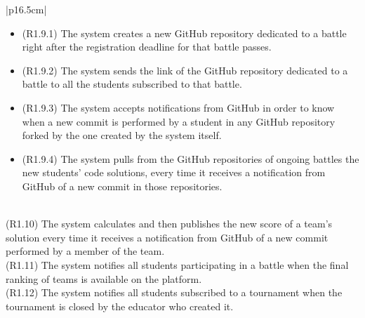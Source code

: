 \begin{longtable}{|p{16.5cm}|}
\begin{minipage}[t]{\linewidth}
\begin{itemize}[nosep]
\item (R1.9.1) The system creates a new GitHub repository dedicated to a battle right after the registration deadline for that battle passes.
\item (R1.9.2) The system sends the link of the GitHub repository dedicated to a battle to all the students subscribed to that battle.
\item (R1.9.3) The system accepts notifications from GitHub in order to know when a new commit is performed by a student in any GitHub repository forked by the one created by the system itself.
\item (R1.9.4) The system pulls from the GitHub repositories of ongoing battles the new students' code solutions, every time it receives a notification from GitHub of a new commit in those repositories.\\
\end{itemize}
\end{minipage} 
\\
\hline 
(R1.10) The system calculates and then publishes the new score of a team's solution every time it receives a notification from GitHub of a new commit performed by a member of the team. \\
\hline
(R1.11) The system notifies all students participating in a battle when the final ranking of teams is available on the platform.  \\
\hline
(R1.12) The system notifies all students subscribed to a tournament when the tournament is closed by the educator who created it.\\
\hline
\end{longtable}


